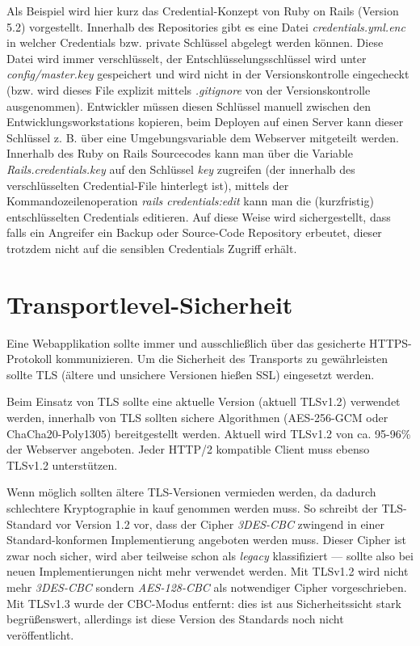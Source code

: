 Als Beispiel wird hier kurz das Credential-Konzept von Ruby on Rails (Version 5.2) vorgestellt. Innerhalb des Repositories gibt es eine Datei \textit{credentials.yml.enc} in welcher Credentials bzw. private Schlüssel abgelegt werden können. Diese Datei wird immer verschlüsselt, der Entschlüsselungsschlüssel wird unter \textit{config/master.key} gespeichert und wird nicht in der Versionskontrolle eingecheckt (bzw. wird dieses File explizit mittels \textit{.gitignore} von der Versionskontrolle ausgenommen). Entwickler müssen diesen Schlüssel manuell zwischen den Entwicklungsworkstations kopieren, beim Deployen auf einen Server kann dieser Schlüssel z. B. über eine Umgebungsvariable dem Webserver mitgeteilt werden. Innerhalb des Ruby on Rails Sourcecodes kann man über die Variable \textit{Rails.credentials.key} auf den Schlüssel \textit{key} zugreifen (der innerhalb des verschlüsselten Credential-File hinterlegt ist), mittels der Kommandozeilenoperation \textit{rails credentials:edit} kann man die (kurzfristig) entschlüsselten Credentials editieren. Auf diese Weise wird sichergestellt, dass falls ein Angreifer ein Backup oder Source-Code Repository erbeutet, dieser trotzdem nicht auf die sensiblen Credentials Zugriff erhält.

\chapter{Transportlevel-Sicherheit}

Eine Webapplikation sollte immer und ausschließlich über das gesicherte HTTPS-Protokoll kommunizieren. Um die Sicherheit des Transports zu gewährleisten sollte TLS (ältere und unsichere Versionen hießen SSL) eingesetzt werden.

Beim Einsatz von TLS sollte eine aktuelle Version (aktuell TLSv1.2) verwendet werden, innerhalb von TLS sollten sichere Algorithmen (AES-256-GCM oder ChaCha20-Poly1305) bereitgestellt werden. Aktuell wird TLSv1.2 von ca. 95-96\% der Webserver angeboten. Jeder HTTP/2 kompatible Client muss ebenso TLSv1.2 unterstützen.

Wenn möglich sollten ältere TLS-Versionen vermieden werden, da dadurch schlechtere Kryptographie in kauf genommen werden muss. So schreibt der TLS-Standard vor Version 1.2 vor, dass der Cipher \textit{3DES-CBC} zwingend in einer Standard-konformen Implementierung angeboten werden muss. Dieser Cipher ist zwar noch sicher, wird aber teilweise schon als \textit{legacy} klassifiziert --- sollte also bei neuen Implementierungen nicht mehr verwendet werden. Mit TLSv1.2 wird nicht mehr \textit{3DES-CBC} sondern \textit{AES-128-CBC} als notwendiger Cipher vorgeschrieben. Mit TLSv1.3 wurde der CBC-Modus entfernt: dies ist aus Sicherheitssicht stark begrüßenswert, allerdings ist diese Version des Standards noch nicht veröffentlicht.

